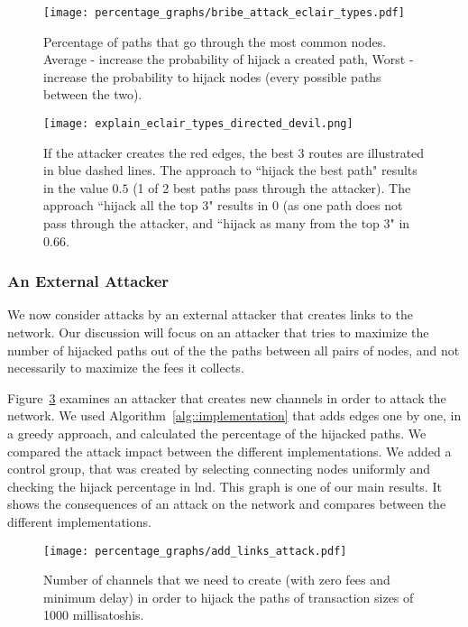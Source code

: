     \begin{figure} 
    	\centering
    	\texttt{[image: percentage\_graphs/bribe\_attack\_eclair\_types.pdf]}
    	\caption{Percentage of paths that go through the most common nodes. Average - increase the probability of hijack a created path, Worst - increase the probability to hijack nodes (every possible paths between the two).}
    	\label{figure::bribe_existing_eclair}
    \end{figure}
    \begin{figure} 
    	\centering
    	\texttt{[image: explain\_eclair\_types\_directed\_devil.png]}
    	\caption{If the attacker creates the red edges, the best 3 routes are illustrated in blue dashed lines. The approach to ``hijack the best path" results in the value $0.5$ (1 of 2 best paths pass through the attacker).
    	The approach ``hijack all the top 3" results in $0$ (as one path does not pass through the attacker, and ``hijack as many from the top 3" in $0.66$.}
    	\label{figure::explain_bribe_existing_eclair}
    \end{figure}
    
\subsubsection{An External Attacker}

We now consider attacks by an external attacker that creates links to the network. 
Our discussion will focus on an attacker that tries to maximize the number of hijacked paths out of the the paths between all pairs of nodes, and not necessarily to maximize the fees it collects. 
    
Figure~\ref{figure::hijack_attack} examines an attacker that creates new channels in order to attack the network. We used Algorithm~\ref{alg::implementation} that adds edges one by one, in a greedy approach, and calculated the percentage of the hijacked paths. We compared the attack impact between the different implementations. We added a control group, that was created by selecting connecting nodes uniformly and checking the hijack percentage in lnd. This graph is one of our main results. It shows the consequences of an attack on the network and compares between the different implementations.

    \begin{figure} 
    	\centering
    	\texttt{[image: percentage\_graphs/add\_links\_attack.pdf]}
    	\caption{Number of channels that we need to create (with zero fees and minimum delay) in order to hijack the paths of transaction sizes of 1000 millisatoshis.}
    	\label{figure::hijack_attack}
    \end{figure}
    
